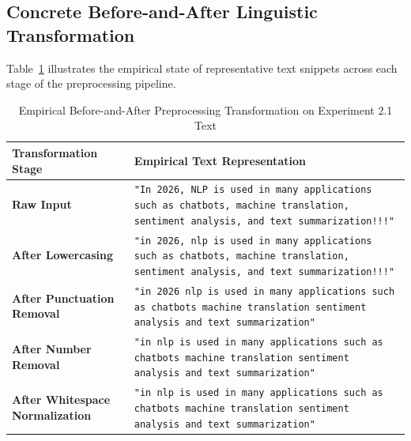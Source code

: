 \documentclass[12pt,a4paper]{report}
\begin{document}
\subsection{Concrete Before-and-After Linguistic Transformation}
Table~\ref{tab:exp2_before_after} illustrates the empirical state of representative text snippets across each stage of the preprocessing pipeline.
\begin{table}[H]
\centering
\small
\caption{Empirical Before-and-After Preprocessing Transformation on Experiment 2.1 Text}
\label{tab:exp2_before_after}
\begin{tabularx}{\textwidth}{lp{11.5cm}}
\toprule
\textbf{Transformation Stage} & \textbf{Empirical Text Representation} \\
\midrule
\textbf{Raw Input} & \texttt{"In 2026, NLP is used in many applications such as chatbots, machine translation, sentiment analysis, and text summarization!!!"} \\
\textbf{After Lowercasing} & \texttt{"in 2026, nlp is used in many applications such as chatbots, machine translation, sentiment analysis, and text summarization!!!"} \\
\textbf{After Punctuation Removal} & \texttt{"in 2026 nlp is used in many applications such as chatbots machine translation sentiment analysis and text summarization"} \\
\textbf{After Number Removal} & \texttt{"in  nlp is used in many applications such as chatbots machine translation sentiment analysis and text summarization"} \\
\textbf{After Whitespace Normalization} & \texttt{"in nlp is used in many applications such as chatbots machine translation sentiment analysis and text summarization"} \\
\bottomrule
\end{tabularx}
\end{table}
\end{document}

